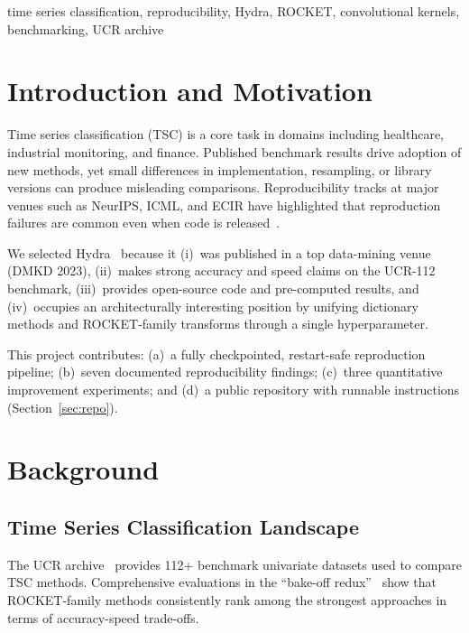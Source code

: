 \documentclass[conference]{IEEEtran}
\begin{document}
\begin{IEEEkeywords}
time series classification, reproducibility, Hydra, ROCKET, convolutional
kernels, benchmarking, UCR archive
\end{IEEEkeywords}

\section{Introduction and Motivation}

Time series classification (TSC) is a core task in domains including
healthcare, industrial monitoring, and finance. Published benchmark results
drive adoption of new methods, yet small differences in implementation,
resampling, or library versions can produce misleading comparisons.
Reproducibility tracks at major venues such as NeurIPS, ICML, and ECIR
have highlighted that reproduction failures are common even when code is
released~\cite{aaai_repro}.

We selected Hydra~\cite{hydra2023} because it (i)~was published in a
top data-mining venue (DMKD 2023), (ii)~makes strong accuracy and speed
claims on the UCR-112 benchmark, (iii)~provides open-source code and
pre-computed results, and (iv)~occupies an architecturally interesting
position by unifying dictionary methods and ROCKET-family transforms
through a single hyperparameter.

This project contributes: (a)~a fully checkpointed, restart-safe
reproduction pipeline; (b)~seven documented reproducibility findings;
(c)~three quantitative improvement experiments; and (d)~a public
repository with runnable instructions (Section~\ref{sec:repo}).

\section{Background}

\subsection{Time Series Classification Landscape}

The UCR archive~\cite{ucr2019} provides 112+ benchmark univariate datasets
used to compare TSC methods. Comprehensive evaluations in the ``bake-off
redux''~\cite{bakeofredux} show that ROCKET-family methods consistently
rank among the strongest approaches in terms of accuracy-speed trade-offs.
\end{document}
